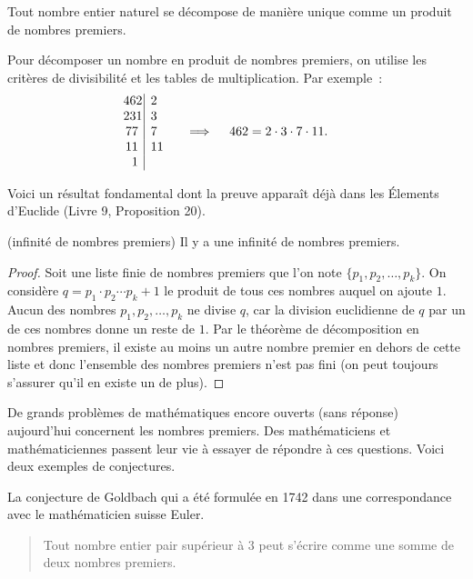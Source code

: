\documentclass[a4paper,12pt]{report}
\begin{document}
\begin{resultat}
	Tout nombre entier naturel se décompose de manière unique comme un produit de nombres premiers.
\end{resultat}
\begin{technique}
	Pour décomposer un nombre en produit de nombres premiers, on utilise les critères de divisibilité et les tables de multiplication.
	Par exemple~: 
	\[
  \begin{array}{|l}
    \llap{462~~} 2 \\
    \llap{231~~} 3  \\
    \llap{77~~~} 7  \\
    \llap{11~~~} 11  \\
    \llap{1~~~}    \\ 
  \end{array} \quad \implies \quad 462=2\cdot 3\cdot 7\cdot 11.
\]
\end{technique}
Voici un résultat fondamental dont la preuve apparaît déjà dans les Élements d'Euclide (Livre 9, Proposition 20).
\begin{resultat}(infinité de nombres premiers)
	Il y a une infinité de nombres premiers.
\end{resultat}
\begin{proof}
	Soit une liste finie de nombres premiers que l'on note $\{p_1,p_2,\ldots,p_k\}$.
	On considère 
	$q=p_1 \cdot p_2 \cdots p_k+1$ le produit de tous ces nombres auquel on ajoute $1$.
	Aucun des nombres $p_1,p_2,\ldots,p_k$ ne divise $q$, car la division euclidienne de $q$ par un de ces nombres donne un reste de $1$.
	Par le théorème de décomposition en nombres premiers, il existe au moins un autre nombre premier en dehors de cette liste et donc l'ensemble des nombres premiers n'est pas fini (on peut toujours s'assurer qu'il en existe un de plus).    
\end{proof}
De grands problèmes de mathématiques encore ouverts (sans réponse) aujourd'hui concernent les nombres premiers.
Des mathématiciens et mathématiciennes passent leur vie à essayer de répondre à ces questions. Voici deux exemples de conjectures. 

La conjecture de Goldbach qui a été formulée en 1742 dans une correspondance avec le mathématicien suisse Euler. 
\begin{quotation}
	Tout nombre entier pair supérieur à 3 peut s'écrire comme une somme de deux nombres premiers.
\end{quotation}
\end{document}
